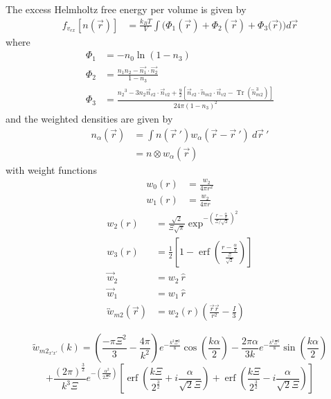\documentclass[double,12pt]{beavtex}
\begin{document}
The excess Helmholtz free energy per volume is given by
\begin{align}
    f_{v_{ex}}[n(\vec{r})] &= \frac{k_BT}{V}\int(\Phi_1(\vec{r})
    +\Phi_2(\vec{r})+\Phi_3(\vec{r}{)) d}\vec{r}
\end{align}     
where
\begin{align}
    \Phi_1 &= -n_{0}\ln(1-n_{3}) \\
    \Phi_2 &= \frac{n_{1}n_{2}-\vec{n_{1}}\cdot\vec{n_{2}}}{1-n_{3}} \\
    \Phi_3 &= \frac{{n_2}^3-3n_2\vec{n}_{v2}\cdot\vec{n}_{v2}+\frac{9}{2}
       [\vec{n}_{v2}\cdot{\overleftrightarrow{n}_{m2}}\cdot{\vec{n}_{v2}}
       -\operatorname{Tr}({\overleftrightarrow{n}^3_{m2}})]}{24\pi(1-n_3)^2}  
\end{align}
and the weighted densities are given by 
\begin{align}
    n_\alpha(\vec r) &= \int n(\vec {r}~')w_\alpha(\vec r-\vec {r}~')
                    ~d\vec {r}~'  \label{weighted_densities}  \\
                     &= n\otimes w_\alpha(\vec r)
\end{align}  
with weight functions
\begin{align}\label{eq:weights}
  w_{0}(r) &=\frac{w_{2}}{4\pi{r}^2} \\
  w_{1}(r) &=\frac{w_{2}}{4\pi{r}} 
\end{align}
\begin{align}
  w_2(r) &=\frac{\sqrt{2}}{\Xi\sqrt\pi}\exp^{-\left(\frac{r-\frac{\alpha}
           {2}}{\Xi/\sqrt{2}}\right)^2}  \\
  w_3(r) &=\frac{1}{2}\left[1-\operatorname{erf}\left(\frac{r
          -\frac{\alpha}{2}}{\frac{\Xi}{\sqrt{2}}}\right)\right]  \\
%    
      \vec {w}_2 &= w_2~\hat r \\
      \vec {w}_1 &= w_1~\hat r \\
      \overleftrightarrow{w}_{m2}(\vec{r}) &= w_2(r)\left(\frac{\vec{r}
                                        \vec{r}}{r^2}-\frac{I}{3}\right) 
\end{align}

\begin{equation}
    {\widetilde{w}_{{m2}_{x'x'}}(k)=\left(\frac{-\pi{\Xi}^2}{3}
   -\frac{4\pi}{k^2}\right)e^{-\frac{k^2\Xi^2}{8}}\cos(\frac{k\alpha}{2})
   -\frac{2\pi\alpha}{3k}e^{-\frac{k^2\Xi^2}{8}}\sin(\frac{k\alpha}{2})}
   \nonumber
\end{equation} 
\begin{equation} %
   {+\frac{{(2\pi)}^{\frac{3}{2}}}{k^3\Xi}e^{-\left(\frac{\alpha^2}
   {2\Xi^2}\right)}\left[\operatorname{erf}\left(\frac{k\Xi}{2^\frac{3}{2}}
   +i\frac{\alpha}{\sqrt{2}\Xi}\right)+\operatorname{erf}\left(\frac{k\Xi}
   {2^\frac{3}{2}}-i\frac{\alpha}{\sqrt{2}\Xi}\right)\right]}
\end{equation} 
\end{document}
